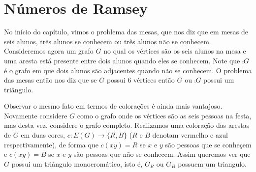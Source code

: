 






\section{Números de Ramsey}

No início do capítulo, vimos o problema das mesas, que nos diz que em mesas de seis alunos, três alunos se conhecem ou três alunos não se conhecem. Consideremos agora um grafo $G$ no qual os vértices são os seis alunos na mesa e uma aresta está presente entre dois alunos quando eles se conhecem. Note que $\comp{G}$ é o grafo em que dois alunos são adjacentes quando não se conhecem. O problema das mesas então nos diz que se $G$ possui 6 vértices então $G$ ou $\comp{G}$ possui um triângulo.

Observar o mesmo fato em termos de colorações é ainda mais vantajoso. Novamente considere $G$ como o grafo onde os vértices são as seis pessoas na festa, mas desta vez, considere o grafo completo. Realizamos uma coloração das arestas de $G$ em duas cores, $c: E(G) \to \{ R,B \}$ ($R$ e $B$ denotam vermelho e azul respectivamente), de forma que $c(xy) = R$ se $x$ e $y$ são pessoas que se conheçem e $c(xy) = B$ se $x$ e $y$ são pessoas que não se conhecem. Assim queremos ver que $G$ possui um triângulo monocromático, isto é, $G_R$ ou $G_B$ possuem um triangulo.

